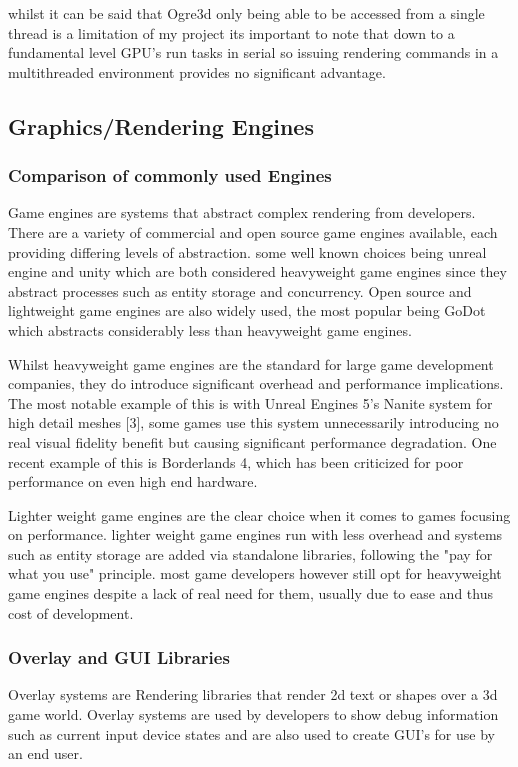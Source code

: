 \documentclass[]{final_report}
\begin{document}
whilst it can be said that Ogre3d only being able to be accessed from a single thread is a limitation of my project its important to note that down to a fundamental level GPU's run tasks in serial so issuing rendering commands in a multithreaded environment provides no significant advantage.
\subsection{Graphics/Rendering Engines}
\subsubsection{Comparison of commonly used Engines}
Game engines are systems that abstract complex rendering from developers. There are a variety of commercial and open source game engines available, each providing differing levels of abstraction. some well known choices being unreal engine and unity which are both considered heavyweight game engines since they abstract processes such as entity storage and concurrency. Open source and lightweight game engines are also widely used, the most popular being GoDot which abstracts considerably less than heavyweight game engines.

Whilst heavyweight game engines are the standard for large game development companies, they do introduce significant overhead and performance implications. The most notable example of this is with Unreal Engines 5's Nanite system for high detail meshes [3], some games use this system unnecessarily introducing no real visual fidelity benefit but causing significant performance degradation. One recent example of this is Borderlands 4, which has been criticized for poor performance on even high end hardware.

Lighter weight game engines are the clear choice when it comes to games focusing on performance. lighter weight game engines run with less overhead and systems such as entity storage are added via standalone libraries, following the "pay for what you use" principle. most game developers however still opt for heavyweight game engines despite a lack of real need for them, usually due to ease and thus cost of development. 

\subsubsection{Overlay and GUI Libraries}
Overlay systems are Rendering libraries that render 2d text or shapes over a 3d game world. Overlay systems are used by developers to show debug information such as current input device states and are also used to create GUI's for use by an end user. 
\end{document}
